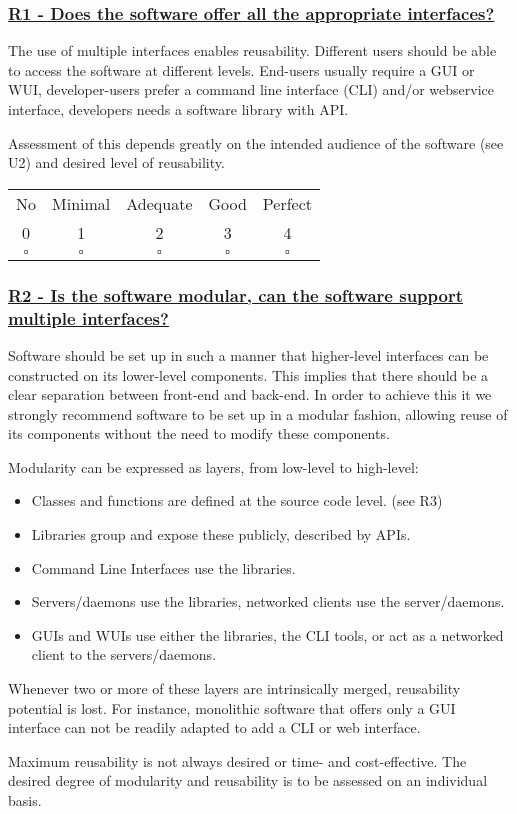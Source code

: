 \documentclass[a4paper,11pt]{article}
\newcommand{\criterion}[2]{\subsubsection*{\underline{#1 - #2}}\label{id:#1}}
\newcommand\CheckTable{%
  \begin{tabular}{ccccc}
    No & Minimal & Adequate & Good & Perfect \\
    0 & 1 & 2 & 3 & 4 \\
    \hline
    $\square$ & $\square$ & $\square$ & $\square$ & $\square$ \\
  \end{tabular}%
}
\begin{document}
\newcommand{\rOneID}{R1}
\newcommand{\rOneText}{Does the software offer all the appropriate interfaces?}
\criterion{\rOneID}{\rOneText}

The use of multiple interfaces enables reusability. Different users should be
able to access the software at different levels. End-users usually require a
GUI or WUI, developer-users prefer a command line interface (CLI) and/or
webservice interface, developers needs a software library with API.

Assessment of this depends greatly on the intended audience of the software
(see U2) and desired level of reusability.

\CheckTable

\newcommand{\rTwoID}{R2}
\newcommand{\rTwoText}{Is the software modular, can the software support multiple interfaces?}
\criterion{\rTwoID}{\rTwoText}

Software should be set up in such a manner that higher-level interfaces can be
constructed on its lower-level components. This implies that there should be a
clear separation between front-end and back-end. In order to achieve this it we
strongly recommend software to be set up in a modular fashion, allowing reuse
of its components without the need to modify these components.

Modularity can be expressed as layers, from low-level to high-level:

\begin{itemize}
 \item Classes and functions are defined at the source code level. (see R3)
 \item Libraries group and expose these publicly, described by APIs. 
 \item Command Line Interfaces use the libraries.
 \item Servers/daemons use the libraries, networked clients use the server/daemons.
 \item GUIs and WUIs use either the libraries, the CLI tools, or act as a networked client to the servers/daemons.
\end{itemize}

Whenever two or more of these layers are intrinsically merged, reusability potential is lost.
For instance, monolithic software that offers only a GUI interface can not be
readily adapted to add a CLI or web interface.

Maximum reusability is not always desired or time- and cost-effective. The
desired degree of modularity and reusability is to be assessed on an
individual basis.
\end{document}
